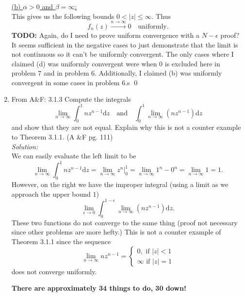 \documentclass[10pt]{amsart}
\newcommand{\D}{\mathrm{d}}
\theoremstyle{nonumberplain}
\begin{document}
\begin{enumerate}[label={\bf {\arabic*}:}]
\underline{(b) $\alpha > 0$ and $\beta = \infty$:} \\
This gives us the following bounds $0 < |z| \leq \infty$.
Thus
$$
f_n(z) \overset{n \to \infty}{\longrightarrow} 0 \quad \text{uniformly}.
$$
\textbf{TODO:} Again, do I need to prove uniform convergence with a $N-\epsilon$ proof?
It seems sufficient in the negative cases to just demonstrate that the limit is not continuous so it can't be uniformly convergent.
The only cases where I claimed (d) was uniformly convergent were when 0 is excluded here in problem 7 and in problem 6.
Additionally, I claimed (b) was uniformly convergent in some cases in problem 6.s
\qed \\

\newpage
\item From A\&F: 3.1.3
Compute the integrals
$$
\lim_{n \rightarrow \infty} \int_0^1 nz^{n -1}\D z \quad \text{and} \quad \int_0^1 \lim_{n \rightarrow \infty} \left(nz^{n -1} \right) \D z
$$
and show that they are not equal.
Explain why this is not a counter example to Theorem 3.1.1. (A \&F pg. 111) \\
\textit{Solution:} \\
We can easily evaluate the left limit to be
$$
\lim_{n \rightarrow \infty} \int_0^1 nz^{n -1}\D z = \lim_{n \rightarrow \infty} \left. z^n \right|_0^1 = \lim_{n \rightarrow \infty} 1^n - 0^n = \lim_{n \rightarrow \infty} 1 = 1.
$$
However, on the right we have the improper integral (using a limit as we approach the upper bound $1$)
$$
\lim_{\epsilon \rightarrow 0}\int_0^{1-\epsilon} \lim_{n \rightarrow \infty} \left(nz^{n -1} \right) \D z.
$$
These two functions do not converge to the same thing (proof not necessary since other problems are more hefty.)
This is not a counter example of Theorem 3.1.1 since the sequence
$$
\lim_{n \rightarrow \infty} nz^{n - 1} =
\begin{cases}
0, \text{ if } |z| < 1 \\
\infty \text{ if } |z| = 1
\end{cases}
$$
does not converge uniformly.

\textbf{There are approximately 34 things to do, 30 down!}
\end{enumerate}
\end{document}
